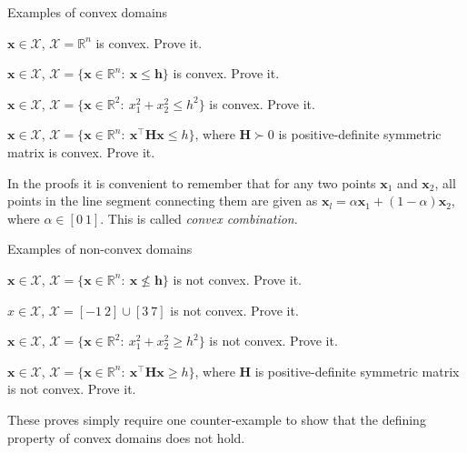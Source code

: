 \documentclass{beamer}
\begin{document}
\begin{frame}{Examples of convex domains}
\begin{flushleft}

$\mathbf{x} \in \mathcal{X}$, $\mathcal{X} = \mathbb{R}^n$  is convex. Prove it.

\bigskip

$\mathbf{x} \in \mathcal{X}$, $\mathcal{X} = \{ \mathbf{x} \in \mathbb{R}^n: \ \mathbf{x} \leq \mathbf{h} \}$ is convex. Prove it.

\bigskip

$\mathbf{x} \in \mathcal{X}$, $\mathcal{X} = \{ \mathbf{x} \in \mathbb{R}^2: \ x_1^2+x_2^2 \leq h^2 \}$ is convex. Prove it.

\bigskip

$\mathbf{x} \in \mathcal{X}$, $\mathcal{X} = \{ \mathbf{x} \in \mathbb{R}^n: \ \mathbf{x}^\top \mathbf{H} \mathbf{x} \leq h \}$, where $\mathbf{H} \succ 0$ is positive-definite symmetric matrix is convex. Prove it.

\bigskip

In the proofs it is convenient to remember that for any two points $\mathbf{x}_1$ and $\mathbf{x}_2$, all points in the line segment connecting them are given as $\mathbf{x}_l = \alpha \mathbf{x}_1 + (1 - \alpha) \mathbf{x}_2$, where $\alpha \in [0 \ 1]$. This is called \emph{convex combination}.
 
\end{flushleft}
\end{frame}


\begin{frame}{Examples of non-convex domains}
\begin{flushleft}

$\mathbf{x} \in \mathcal{X}$, $\mathcal{X} = \{ \mathbf{x} \in \mathbb{R}^n: \ \mathbf{x} \nleqslant \mathbf{h} \}$ is not convex. Prove it.

\bigskip

$x \in \mathcal{X}$, $\mathcal{X} = [-1 \ 2] \cup [3 \ 7]$ is not convex. Prove it.

\bigskip

$\mathbf{x} \in \mathcal{X}$, $\mathcal{X} = \{ \mathbf{x} \in \mathbb{R}^2: \ x_1^2+x_2^2 \geq h^2 \}$ is not convex. Prove it.

\bigskip

$\mathbf{x} \in \mathcal{X}$, $\mathcal{X} = \{ \mathbf{x} \in \mathbb{R}^n: \ \mathbf{x}^\top \mathbf{H} \mathbf{x} \geq h \}$, where $\mathbf{H}$ is positive-definite symmetric matrix is not convex. Prove it.

\bigskip

These proves simply require one counter-example to show that the defining property of convex domains does not hold.
 
\end{flushleft}
\end{frame}
\end{document}
